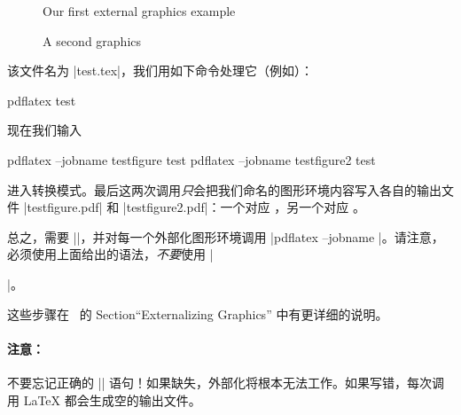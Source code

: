 {\begin{codeexample}
    \begin{figure}
        \endpgfgraphicnamed
        \caption{Our first external graphics example}
    \end{figure}

    \begin{figure}
        \endpgfgraphicnamed
        \caption{A second graphics}
    \end{figure}

\end{codeexample}
%
\noindent 该文件名为 |test.tex|，我们用如下命令处理它（例如）：
%
\begin{codeexample}
pdflatex test
\end{codeexample}
%
\noindent 现在我们输入
%
\begin{codeexample}
pdflatex --jobname testfigure test
pdflatex --jobname testfigure2 test
\end{codeexample}
%
\noindent 进入转换模式。最后这两次调用\emph{只}会把我们命名的图形环境内容写入各自的输出文件 |testfigure.pdf| 和 |testfigure2.pdf|：一个对应 ，另一个对应 。

总之，需要 |\pgfrealjobname|，并对每一个外部化图形环境调用
|pdflatex --jobname |。请注意，必须使用上面给出的语法，\emph{不要}使用 |\begin{pgfgraphicnamed}|。

这些步骤在~\cite{tikz} 的 Section``Externalizing Graphics'' 中有更详细的说明。


\paragraph{注意：}

不要忘记正确的 |\pgfrealjobname| 语句！如果缺失，外部化将根本无法工作。如果写错，每次调用 \LaTeX{} 都会生成空的输出文件。


\end{pgfgraphicnamed}}
